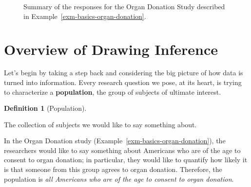 \documentclass[
  letterpaper,
  DIV=11,
  numbers=noendperiod]{scrreprt}
\theoremstyle{definition}
\newtheorem{definition}{Definition}[chapter]
\theoremstyle{definition}
\theoremstyle{plain}
\theoremstyle{remark}
\begin{document}
\begin{figure}


\caption{\label{fig-basics-organ-plot}Summary of the responses for the
Organ Donation Study described in
Example~\ref{exm-basics-organ-donation}.}

\end{figure}%

\section{Overview of Drawing
Inference}\label{overview-of-drawing-inference}

Let's begin by taking a step back and considering the big picture of how
data is turned into information. Every research question we pose, at its
heart, is trying to characterize a \textbf{population}, the group of
subjects of ultimate interest.

\begin{definition}[Population]\protect\hypertarget{def-population}{}\label{def-population}

The collection of subjects we would like to say something about.

\end{definition}

In the Organ Donation study (Example~\ref{exm-basics-organ-donation}),
the researchers would like to say something about Americans who are of
the age to consent to organ donation; in particular, they would like to
quantify how likely it is that someone from this group agrees to organ
donation. Therefore, the population is \emph{all Americans who are of
the age to consent to organ donation}.
\end{document}
